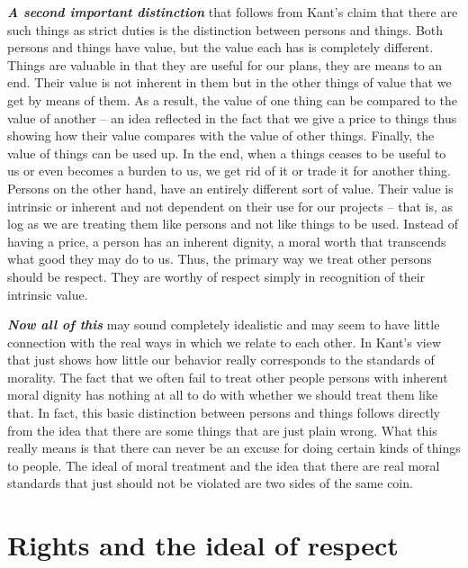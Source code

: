 \documentclass[
  12pt, openany]{book}
\theoremstyle{definition}
\theoremstyle{definition}
\theoremstyle{definition}
\theoremstyle{remark}
\begin{document}
\textbf{\emph{A second important distinction}} that follows from Kant's claim that there are such things as strict duties is the distinction between persons and things. Both persons and things have value, but the value each has is completely different. Things are valuable in that they are useful for our plans, they are means to an end. Their value is not inherent in them but in the other things of value that we get by means of them. As a result, the value of one thing can be compared to the value of another -- an idea reflected in the fact that we give a price to things thus showing how their value compares with the value of other things. Finally, the value of things can be used up. In the end, when a things ceases to be useful to us or even becomes a burden to us, we get rid of it or trade it for another thing. Persons on the other hand, have an entirely different sort of value. Their value is intrinsic or inherent and not dependent on their use for our projects -- that is, as log as we are treating them like persons and not like things to be used. Instead of having a price, a person has an inherent dignity, a moral worth that transcends what good they may do to us. Thus, the primary way we treat other persons should be respect. They are worthy of respect simply in recognition of their intrinsic value.

\textbf{\emph{Now all of this}} may sound completely idealistic and may seem to have little connection with the real ways in which we relate to each other. In Kant's view that just shows how little our behavior really corresponds to the standards of morality. The fact that we often fail to treat other people persons with inherent moral dignity has nothing at all to do with whether we should treat them like that. In fact, this basic distinction between persons and things follows directly from the idea that there are some things that are just plain wrong. What this really means is that there can never be an excuse for doing certain kinds of things to people. The ideal of moral treatment and the idea that there are real moral standards that just should not be violated are two sides of the same coin.

\hypertarget{rights-and-the-ideal-of-respect}{%
\section{Rights and the ideal of respect}\label{rights-and-the-ideal-of-respect}}
\end{document}
